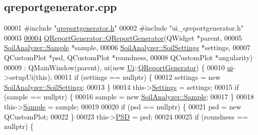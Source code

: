 \hypertarget{qreportgenerator_8cpp_source}{}\subsection{qreportgenerator.\+cpp}
\label{qreportgenerator_8cpp_source}

\begin{DoxyCode}
00001 \textcolor{preprocessor}{#include "\hyperlink{qreportgenerator_8h}{qreportgenerator.h}"}
00002 \textcolor{preprocessor}{#include "ui\_qreportgenerator.h"}
00003 
\hypertarget{qreportgenerator_8cpp_source_l00004}{}\hyperlink{class_q_report_generator_a3423584a1653cd7271a4d8526b2edf02}{00004} \hyperlink{class_q_report_generator_a3423584a1653cd7271a4d8526b2edf02}{QReportGenerator::QReportGenerator}(QWidget *parent,
00005                                    \hyperlink{class_soil_analyzer_1_1_sample}{SoilAnalyzer::Sample} *sample,
00006                                    \hyperlink{class_soil_analyzer_1_1_soil_settings}{SoilAnalyzer::SoilSettings} *settings,
00007                                    QCustomPlot *psd, QCustomPlot *roundness,
00008                                    QCustomPlot *angularity)
00009     : QMainWindow(parent), ui(new \hyperlink{namespace_ui}{Ui}::\hyperlink{class_q_report_generator}{QReportGenerator}) \{
00010   \hyperlink{class_q_report_generator_a4584dd4f053586b84b4a9f883a3313d9}{ui}->setupUi(\textcolor{keyword}{this});
00011   \textcolor{keywordflow}{if} (settings == \textcolor{keyword}{nullptr}) \{
00012     settings = \textcolor{keyword}{new} \hyperlink{class_soil_analyzer_1_1_soil_settings}{SoilAnalyzer::SoilSettings};
00013   \}
00014   this->\hyperlink{class_q_report_generator_a5e75a3f9447c0c24b32cd198a00af21c}{Settings} = settings;
00015   \textcolor{keywordflow}{if} (sample == \textcolor{keyword}{nullptr}) \{
00016     sample = \textcolor{keyword}{new} \hyperlink{class_soil_analyzer_1_1_sample}{SoilAnalyzer::Sample};
00017   \}
00018   this->\hyperlink{class_q_report_generator_a779d8c539bb762daccaf61189cedcae5}{Sample} = sample;
00019 
00020   \textcolor{keywordflow}{if} (psd == \textcolor{keyword}{nullptr}) \{
00021     psd = \textcolor{keyword}{new} QCustomPlot;
00022   \}
00023   this->\hyperlink{class_soil_math_1_1_p_s_d}{PSD} = psd;
00024 
00025   \textcolor{keywordflow}{if} (roundness == \textcolor{keyword}{nullptr}) \{

\end{DoxyCode}

